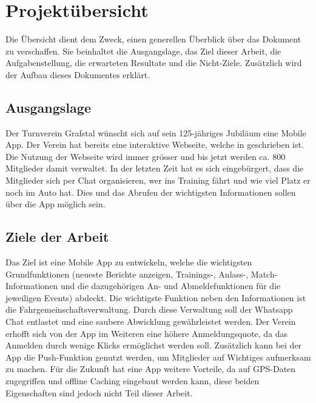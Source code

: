 %
%

\chapter{Projektübersicht}\label{chap.projektuebersicht}
Die Übersicht dient dem Zweck, einen generellen Überblick über das Dokument zu verschaffen. Sie beinhaltet die Ausgangslage, das Ziel dieser Arbeit, die Aufgabenstellung, die erwarteten Resultate und die Nicht-Ziele. Zusätzlich wird der Aufbau dieses Dokumentes erklärt.

\section{Ausgangslage}\label{ausganglage}
Der Turnverein Grafstal wünscht sich auf sein 125-jähriges Jubiläum eine Mobile App. Der Verein hat bereits eine interaktive Webseite, welche in  geschrieben ist. Die Nutzung der Webseite wird immer grösser und bis jetzt werden ca. 800 Mitglieder damit verwaltet. In der letzten Zeit hat es sich eingebürgert, dass die Mitglieder sich per Chat organisieren, wer ins Training fährt und wie viel Platz er noch im Auto hat. Dies und das Abrufen der wichtigsten Informationen sollen über die App möglich sein.

\section{Ziele der Arbeit}\label{ziele}
Das Ziel ist eine Mobile App zu entwickeln, welche die wichtigsten Grundfunktionen (neueste Berichte anzeigen, Trainings-, Anlass-, Match-Informationen und die dazugehörigen An- und Abmeldefunktionen für die jeweiligen Events) abdeckt. Die wichtigste Funktion neben den Informationen ist die Fahrgemeinschaftsverwaltung. Durch diese Verwaltung soll der Whatsapp Chat entlastet und eine saubere Abwicklung gewährleistet werden. Der Verein erhofft sich von der App im Weiteren eine höhere Anmeldungsquote, da das Anmelden durch wenige Klicks ermöglichst werden soll. Zusätzlich kann bei der App die Push-Funktion genutzt werden, um Mitglieder auf Wichtiges aufmerksam zu machen. Für die Zukunft hat eine App weitere Vorteile, da auf GPS-Daten zugegriffen und offline Caching eingebaut werden kann, diese beiden Eigenschaften sind jedoch nicht Teil dieser Arbeit.

